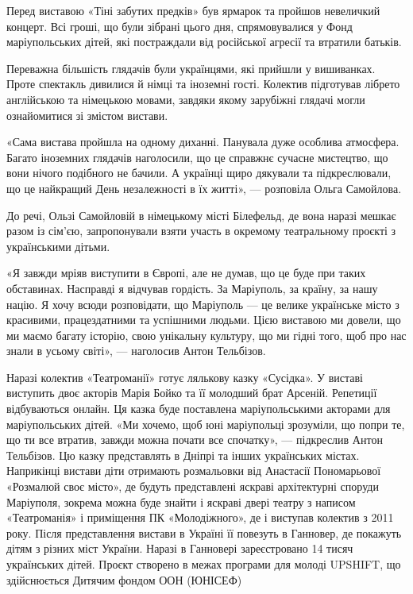 Перед виставою «Тіні забутих предків» був ярмарок та пройшов невеличкий
концерт. Всі гроші, що були зібрані цього дня, спрямовувалися у Фонд
маріупольських дітей, які постраждали від російської агресії та втратили
батьків.

Переважна більшість глядачів були українцями, які прийшли у вишиванках. Проте
спектакль дивилися й німці та іноземні гості. Колектив підготував лібрето
англійською та німецькою мовами, завдяки якому зарубіжні глядачі могли
ознайомитися зі змістом вистави. 

«Сама вистава пройшла на одному диханні. Панувала дуже особлива атмосфера.
Багато іноземних глядачів наголосили, що це справжнє сучасне мистецтво, що вони
нічого подібного не бачили. А українці щиро дякували та підкреслювали, що це
найкращий День незалежності в їх житті», — розповіла Ольга Самойлова.

До речі, Ользі Самойловій в німецькому місті Білефельд, де вона наразі мешкає
разом із сім'єю, запропонували взяти участь в окремому театральному проєкті з
українськими дітьми.

«Я завжди мріяв виступити в Європі, але не думав, що це буде при таких
обставинах. Насправді я відчував гордість. За Маріуполь, за країну, за нашу
націю. Я хочу всюди розповідати, що Маріуполь — це велике українське місто з
красивими, працездатними та успішними людьми. Цією виставою ми довели, що ми
маємо багату історію, свою унікальну культуру, що ми гідні того, щоб про нас
знали в усьому світі», — наголосив Антон Тельбізов. 

Наразі колектив «Театроманії» готує лялькову казку «Сусідка». У виставі
виступить двоє акторів Марія Бойко та її молодший брат Арсеній. Репетиції
відбуваються онлайн. Ця казка буде поставлена маріупольськими акторами для
маріупольських дітей.  «Ми хочемо, щоб юні маріупольці зрозуміли, що попри те,
що ти все втратив, завжди можна почати все спочатку», — підкреслив Антон
Тельбізов.  Цю казку представлять в Дніпрі та інших українських містах.
Наприкінці вистави діти отримають розмальовки від Анастасії Пономарьової
«Розмалюй своє місто», де будуть представлені яскраві архітектурні споруди
Маріуполя, зокрема можна буде знайти і яскраві двері театру з написом
«Театроманія» і приміщення ПК «Молодіжного», де і виступав колектив з 2011
року. Після представлення вистави в Україні її повезуть в Ганновер, де покажуть
дітям з різних міст України. Наразі в Ганновері зареєстровано 14 тисяч
українських дітей. Проєкт створено в межах програми для молоді UPSHIFT, що
здійснюється Дитячим фондом ООН (ЮНІСЕФ)

